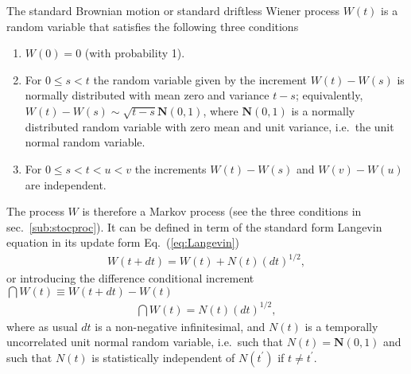 \documentclass[10pt,a4paper]{article}
\newcommand{\eq}[1]{Eq.~(\ref{#1})}
\newcommand{\gaussian}{\ensuremath{\mathbf{N}}}
\begin{document}
The standard Brownian motion or standard driftless Wiener process $W(t)$
is a random variable that satisfies the following three conditions
\citep{higham:2001}
\begin{enumerate}
\item $W(0) = 0$ (with probability 1).
\item For $0\leq s < t $ the random variable given by the increment
$W(t){-}W(s)$ is normally distributed with mean zero and variance $t{-}s$; 
equivalently, $W(t){-}W(s) \sim \sqrt{t{-}s}\gaussian(0,1)$, where 
$\gaussian(0,1)$ is a normally distributed random variable with zero
mean and unit variance, i.e.\ the unit normal random variable.
\item For $0\leq s<t<u<v$ the increments $W(t){-}W(s)$ and $W(v){-}W(u)$
are independent.
\end{enumerate}
The process $W$ is therefore a Markov process (see the three conditions in 
sec.~\ref{sub:stocproc}). It can be defined in term of the standard form
Langevin equation in its update form \eq{eq:Langevin} \citep{gillespie:1996a}
\begin{align}
W(t{+}dt) = W(t) + N(t)(dt)^{1/2}, \label{eq:Wiener1}
\end{align}
or introducing the difference conditional increment 
$\dint{W(t)}\equiv W(t{+}dt){-}W(t)$ \citep{gillespie:1996c}
\begin{align}
\dint{W(t)} = N(t)(dt)^{1/2}, \label{eq:Wiener1a}
\end{align}
where as usual $dt$ is a non-negative infinitesimal, and $N(t)$ is a
temporally uncorrelated unit normal random variable, i.e.\ such that
$N(t)=\gaussian(0,1)$ and such that $N(t)$ is statistically independent of
$N(t^\prime)$ if $t\neq t^\prime$.
\end{document}
